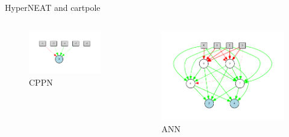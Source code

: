 \documentclass{beamer}
\begin{document}
\begin{frame}{HyperNEAT and cartpole}
    \begin{columns}
        \begin{column}{0.5\textwidth}
        \begin{figure}[c]
            \includegraphics[width=\textwidth]{pdf/hyperneat_pole_balancing_cppn.pdf}
       \caption{CPPN}
        \end{figure}\end{column}
        \begin{column}{0.5\textwidth}
            \begin{figure}[c]
                \includegraphics[width=\textwidth]{pdf/hyperneat_pole_balancing_winner.pdf}
            \caption{ANN}
            \end{figure}
        \end{column}
    \end{columns}
\end{frame}
\end{document}
